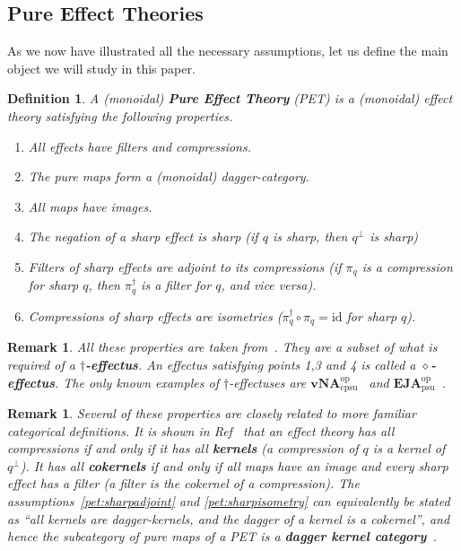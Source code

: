 \documentclass[a4paper,onecolumn,10pt,accepted=2019-05-03, issue=1, volume=1, shorttitle=papers/compositionality-1-1]{compositionalityarticle}
\newcounter{counter}
\numberwithin{counter}{section}
\newtheorem{definition}[counter]{Definition}
\newtheorem{remark}[counter]{Remark}
\newcommand{\id}{\text{id}}
\newcommand{\opp}{\text{op}}
\begin{document}
\subsection{Pure Effect Theories}

As we now have illustrated all the necessary assumptions, let us define the main object we will study in this paper.

\begin{definition}\label{def:PET}
    A (monoidal) \textbf{Pure Effect Theory} (PET) is a (monoidal) effect theory satisfying the following properties.
    \begin{enumerate}[label=({P}\theenumi), ref=P\theenumi]
        \item \label{pet:filtcompr} All effects have filters and compressions.
        \item \label{pet:dagger} The pure maps form a (monoidal) dagger-category.
        \item \label{pet:images} All maps have images.
        \item \label{pet:sharpnegation} The negation of a sharp effect is sharp (if $q$ is sharp, then $q^\perp$ is sharp)
        \item \label{pet:sharpadjoint} Filters of sharp effects are adjoint to its compressions (if $\pi_q$ is a compression for sharp $q$, then $\pi_q^\dagger$ is a filter for $q$, and vice versa).
        \item \label{pet:sharpisometry} Compressions of sharp effects are isometries ($\pi_q^\dagger\circ\pi_q = \id$ for sharp $q$).
    \end{enumerate}
\end{definition}

\begin{remark}
    All these properties are taken from~\cite{basthesis}. They are a subset of what is required of a \textbf{$\dagger$-effectus}. An effectus satisfying points 1,3 and 4 is called a \textbf{$\diamond$-effectus}. The only known examples of $\dagger$-effectuses are $\textbf{vNA}^\opp_{\text{cpsu}}$~\cite{bramthesis} and $\textbf{EJA}^\opp_{\text{psu}}$~\cite{westerbaan2018puremaps}.
\end{remark}

\begin{remark}
    Several of these properties are closely related to more familiar categorical definitions. It is shown in Ref~\cite{basthesis} that an effect theory has all compressions if and only if it has all \textbf{kernels} (a compression of $q$ is a kernel of $q^\perp$). It has all \textbf{cokernels} if and only if all maps have an image and every sharp effect has a filter (a filter is the cokernel of a compression). The assumptions~\ref{pet:sharpadjoint} and \ref{pet:sharpisometry} can equivalently be stated as ``all kernels are dagger-kernels, and the dagger of a kernel is a cokernel'', and hence the subcategory of pure maps of a PET is a \textbf{dagger kernel category}~\cite{heunen2010quantum}.
\end{remark}
\end{document}
